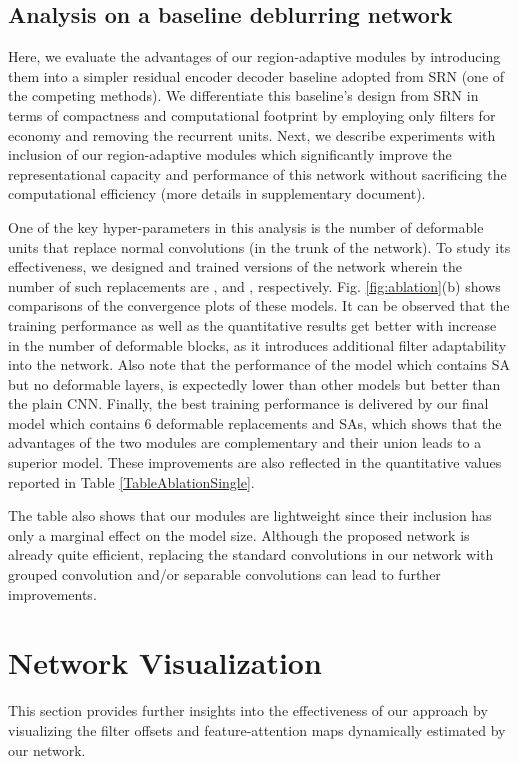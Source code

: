 \documentclass[letterpaper]{article} \usepackage{aaai20}  \usepackage{times}  \usepackage{helvet} \usepackage{courier}  \usepackage[hyphens]{url}  \usepackage{graphicx} \urlstyle{rm} \def\UrlFont{\rm}  \usepackage{graphicx}  \frenchspacing  \setlength{\pdfpagewidth}{8.5in}  \setlength{\pdfpageheight}{11in}
\begin{document}
\subsection{Analysis on a baseline deblurring network}

Here, we evaluate the advantages of our region-adaptive modules by introducing them into a simpler residual encoder decoder baseline adopted from SRN (one of the competing methods). We differentiate this baseline's design from SRN in terms of compactness and computational footprint by employing only  filters for economy and removing the recurrent units. Next, we describe experiments with inclusion of our region-adaptive modules which significantly improve the representational capacity and performance of this network without sacrificing the computational efficiency (more details in supplementary document).

One of the key hyper-parameters in this analysis is the number of deformable units that replace normal convolutions (in the trunk of the network). To study its effectiveness, we designed and trained  versions of the network wherein the number of such replacements are ,  and , respectively. Fig. \ref{fig:ablation}(b) shows comparisons of the convergence plots of these models. It can be observed that the training performance as well as the quantitative results get better with increase in the number of deformable blocks, as it introduces additional filter adaptability into the network. Also note that the performance of the model which contains SA but no deformable layers, is expectedly lower than other models but better than the plain CNN. Finally, the best training performance is delivered by our final model which contains 6 deformable replacements and SAs, which shows that the advantages of the two modules are complementary and their union leads to a superior model. These improvements are also reflected in the quantitative values reported in Table \ref{TableAblationSingle}. 

The table also shows that our modules are lightweight since their inclusion has only a marginal effect on the model size. Although the proposed network is already quite efficient, replacing the standard convolutions in our network with grouped convolution and/or separable convolutions can lead to further improvements. 





\section{Network Visualization}
This section provides further insights into the effectiveness of our approach by visualizing the filter offsets and feature-attention maps dynamically estimated by our network. 
\end{document}
